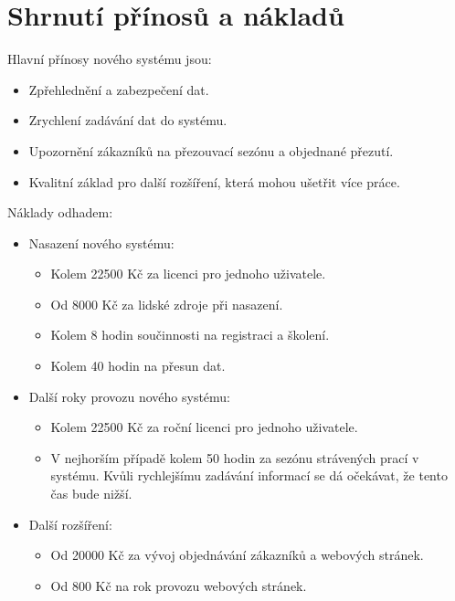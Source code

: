 \section{Shrnutí přínosů a nákladů}
Hlavní přínosy nového systému jsou:
\begin{itemize}
    \item Zpřehlednění a zabezpečení dat.
    \item Zrychlení zadávání dat do systému.
    \item Upozornění zákazníků na přezouvací sezónu a objednané přezutí.
    \item Kvalitní základ pro další rozšíření, která mohou ušetřit více práce.
\end{itemize}
Náklady odhadem:
\begin{itemize}
    \item Nasazení nového systému:
    \begin{itemize}
        \item Kolem 22500 Kč za licenci pro jednoho uživatele.
        \item Od 8000 Kč za lidské zdroje při nasazení.
        \item Kolem 8 hodin součinnosti na registraci a školení.
        \item Kolem 40 hodin na přesun dat.
    \end{itemize}
    \item Další roky provozu nového systému:
    \begin{itemize}
        \item Kolem 22500 Kč za roční licenci pro jednoho uživatele.
        \item V nejhorším případě kolem 50 hodin za sezónu strávených prací v systému. Kvůli rychlejšímu zadávání informací se dá očekávat, že tento čas bude nižší.
    \end{itemize}
    \item Další rozšíření:
    \begin{itemize}
        \item Od 20000 Kč za vývoj objednávání zákazníků a webových stránek.
        \item Od 800 Kč na rok provozu webových stránek.
    \end{itemize}
\end{itemize}
